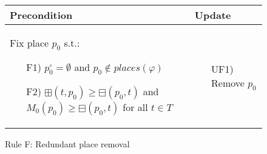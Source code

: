 \begin{figure}[h!]
    \vspace{5mm}

    \begin{adjustbox}{center}
        \begin{tabular}{|p{79mm}|p{54mm}|} \hline
        Precondition & Update \\ \hline
        Fix place $p_0$ s.t.:
        \begin{itemize}[leftmargin=10mm]
            \item[F1)] $p_0^\circ=\emptyset$ and $p_0\notin places(\varphi)$
            \item[F2)] $\boxplus(t, p_0)\geq\boxminus(p_0, t)$ and $M_0(p_0)\geq\boxminus(p_0, t)$ for all $t\in T$
        \end{itemize} &
        \begin{itemize}[leftmargin=10mm]
            \item[UF1)] Remove $p_0$
        \end{itemize} \\ \hline
        \end{tabular}
    \end{adjustbox}
    \caption{Rule F: Redundant place removal}
    \label{fig:rule_f}
\end{figure}
